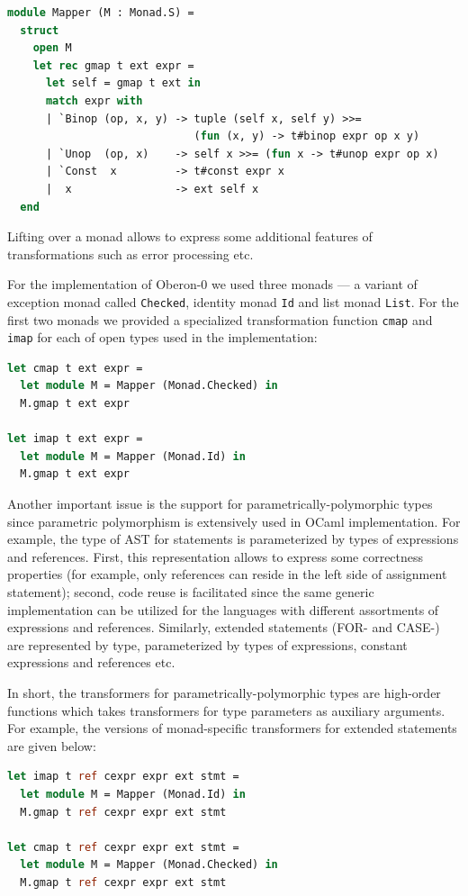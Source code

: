 \begin{lstlisting}[language=ocaml]
module Mapper (M : Monad.S) =
  struct
    open M
    let rec gmap t ext expr = 
      let self = gmap t ext in
      match expr with
      | `Binop (op, x, y) -> tuple (self x, self y) >>= 
                             (fun (x, y) -> t#binop expr op x y)
      | `Unop  (op, x)    -> self x >>= (fun x -> t#unop expr op x)
      | `Const  x         -> t#const expr x
      |  x                -> ext self x 
  end
\end{lstlisting}

Lifting over a monad allows to express some additional features of transformations
such as error processing etc.

For the implementation of Oberon-0 we used three monads --- a variant of exception monad 
called \lstinline{Checked}, identity monad \lstinline{Id} and list monad \lstinline{List}. 
For the first two monads we provided a specialized transformation function \lstinline{cmap}
and \lstinline{imap} for each of open types used in the implementation:

\begin{lstlisting}[language=ocaml]
let cmap t ext expr =
  let module M = Mapper (Monad.Checked) in
  M.gmap t ext expr

let imap t ext expr =
  let module M = Mapper (Monad.Id) in
  M.gmap t ext expr
\end{lstlisting}

Another important issue is the support for parametrically-polymorphic types since parametric polymorphism 
is extensively used in OCaml implementation. For example, the type of AST for statements is parameterized
by types of expressions and references. First, this representation allows to express some correctness 
properties (for example, only references can reside in the left side of assignment statement); second, code
reuse is facilitated since the same generic implementation can be utilized for the languages with different
assortments of expressions and references. Similarly, extended statements (FOR- and CASE-) are represented
by type, parameterized by types of expressions, constant expressions and references etc.

In short, the transformers for parametrically-polymorphic types are high-order functions which takes transformers 
for type parameters as auxiliary arguments. For example, the versions of monad-specific transformers for
extended statements are given below:

\begin{lstlisting}[language=ocaml]
let imap t ref cexpr expr ext stmt =
  let module M = Mapper (Monad.Id) in
  M.gmap t ref cexpr expr ext stmt

let cmap t ref cexpr expr ext stmt =
  let module M = Mapper (Monad.Checked) in
  M.gmap t ref cexpr expr ext stmt
\end{lstlisting}

